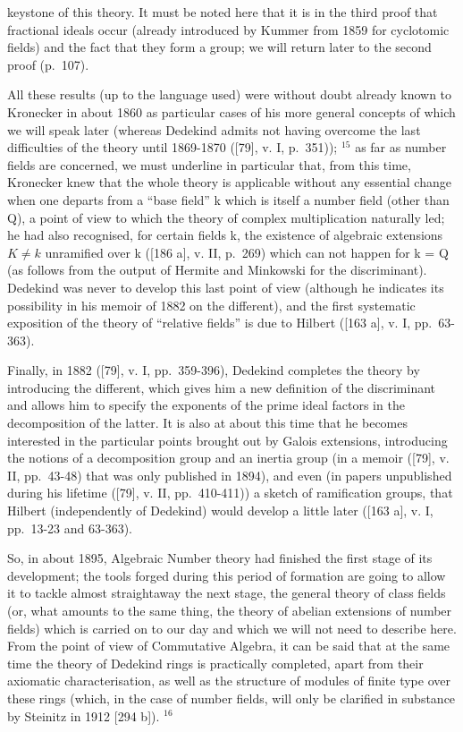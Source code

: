keystone of this theory. It must be noted here that it is in the third proof that fractional ideals occur (already introduced by Kummer from 1859 for cyclotomic fields) and the fact that they form a group; we will return later to the second proof (p.~107).

All these results (up to the language used) were without doubt already known to Kronecker in about 1860 as particular cases of his more general concepts of which we will speak later (whereas Dedekind admits not having overcome the last difficulties of the theory until 1869-1870 ({[}79{]}, v. I, p.~351)); \(^{15}\) as far as number fields are concerned, we must underline in particular that, from this time, Kronecker knew that the whole theory is applicable without any essential change when one departs from a ``base field'' k which is itself a number field (other than Q), a point of view to which the theory of complex multiplication naturally led; he had also recognised, for certain fields k, the existence of algebraic extensions \(K \neq k\) unramified over k ({[}186 a{]}, v. II, p.~269) which can not happen for k = Q (as follows from the output of Hermite and Minkowski for the discriminant). Dedekind was never to develop this last point of view (although he indicates its possibility in his memoir of 1882 on the different), and the first systematic exposition of the theory of ``relative fields'' is due to Hilbert ({[}163 a{]}, v. I, pp.~63-363).

Finally, in 1882 ({[}79{]}, v. I, pp.~359-396), Dedekind completes the theory by introducing the different, which gives him a new definition of the discriminant and allows him to specify the exponents of the prime ideal factors in the decomposition of the latter. It is also at about this time that he becomes interested in the particular points brought out by Galois extensions, introducing the notions of a decomposition group and an inertia group (in a memoir ({[}79{]}, v. II, pp.~43-48) that was only published in 1894), and even (in papers unpublished during his lifetime ({[}79{]}, v. II, pp.~410-411)) a sketch of ramification groups, that Hilbert (independently of Dedekind) would develop a little later ({[}163 a{]}, v. I, pp.~13-23 and 63-363).

So, in about 1895, Algebraic Number theory had finished the first stage of its development; the tools forged during this period of formation are going to allow it to tackle almost straightaway the next stage, the general theory of class fields (or, what amounts to the same thing, the theory of abelian extensions of number fields) which is carried on to our day and which we will not need to describe here. From the point of view of Commutative Algebra, it can be said that at the same time the theory of Dedekind rings is practically completed, apart from their axiomatic characterisation, as well as the structure of modules of finite type over these rings (which, in the case of number fields, will only be clarified in substance by Steinitz in 1912 {[}294 b{]}). \(^{16}\)

